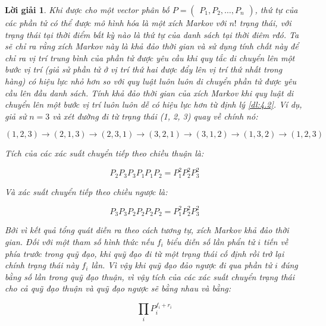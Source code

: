 \documentclass[14pt, a4paper]{article}
\numberwithin{equation}{section}
\numberwithin{figure}{section}
\theoremstyle{sltheorem}
\theoremstyle{soltheorem}
\newtheorem*{loigiai}{Lời giải}
\numberwithin{dl}{section}
\numberwithin{md}{section}
\numberwithin{vd}{section}
\begin{document}
    \begin{loigiai}
        Khi được cho một vector phân bố $P=\begin{pmatrix}
            P_1, P_2, \dots, P_n
        \end{pmatrix}$, thứ tự của các phần tử có thể được mô hình hóa là một xích Markov với $n!$ trạng thái, với trạng thái tại thời điểm bất kỳ nào là thứ tự của danh sách tại thời điêm rđó.
        Ta sẽ chỉ ra rằng xích Markov này là khả đảo thời gian và sử dụng tính chất này để chỉ ra vị trí trung bình của phần tử được yêu cầu khi quy tắc di chuyển lên một bước vị trí (giả sử phần tử ở vị trí thứ hai được đẩy lên vị trí thứ nhất trong hàng) có hiệu lực nhỏ hơn so với quy luật luôn luôn di chuyển phần tử được yêu cầu lên đầu danh sách.
        Tính khả đảo thời gian của xích Markov khi quy luật di chuyển lên một bước vị trí luôn luôn dễ có hiệu lực hơn từ định lý \ref{dl:4.2}.
        Ví dụ, giả sử $n=3$ và xét đường đi từ trạng thái (1, 2, 3) quay về chính nó:

        \begin{equation*}
            (1, 2, 3) \rightarrow (2, 1, 3) \rightarrow (2, 3, 1) \rightarrow (3, 2, 1) \rightarrow(3, 1, 2) \rightarrow (1, 3, 2) \rightarrow (1, 2, 3)
        \end{equation*}

        Tích của các xác suất chuyển tiếp theo chiều thuận là:

        \begin{equation*}
            P_2 P_3 P_3 P_1 P_1 P_2 = P_1^2 P_2^2 P_3^2
        \end{equation*}

        Và xác suất chuyển tiếp theo chiều ngược là:

        \begin{equation*}
            P_3 P_3 P_2 P_2 P_2 P_2 = P_1^2 P_2^2 P_3^2
        \end{equation*}

        Bởi vì kết quả tổng quát diễn ra theo cách tương tự, xích Markov khả đảo thời gian. 
        Đối với một tham số hình thức nếu $f_i$ biểu diễn số lần phẩn tử $i$ tiến về phía trước trong quỹ đạo, khi quỹ đạo đi từ một trạng thái cố định rồi trở lại chính trạng thái này $f_i$ lần.
        Vì vậy khi quỹ đạo đảo ngược đi qua phần tử $i$ đúng bằng số lần trong quỹ đạo thuận, vì vậy tích của các xác suất chuyển trạng thái cho cả quỹ đạo thuận và quỹ đạo ngược sẽ bằng nhau và bằng:

        \begin{equation*}
            \displaystyle\prod_i P_i^{f_i + r_i}
        \end{equation*}


\end{loigiai}
\end{document}
